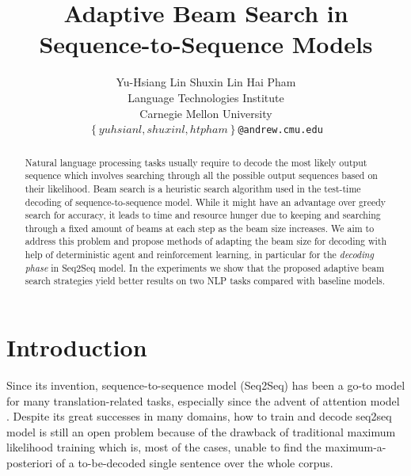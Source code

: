 \documentclass[11pt,a4paper]{article}
\title{Adaptive Beam Search in Sequence-to-Sequence Models}
\author{Yu-Hsiang Lin \quad Shuxin Lin \quad Hai Pham \\
  Language Technologies Institute \\
  Carnegie Mellon University \\
{\tt\small $\left\{yuhsianl, shuxinl, htpham\right\}$@andrew.cmu.edu}
  }
\date{}
\begin{document}
\maketitle
\begin{abstract}
Natural language processing tasks usually require to decode the most likely output sequence which involves searching through all the possible output sequences based on their likelihood. Beam search is a heuristic search algorithm used in the test-time decoding of sequence-to-sequence model. While it might have an advantage over greedy search for accuracy, it leads to time and resource hunger due to keeping and searching through a fixed amount of beams at each step as the beam size increases. We aim to address this problem and propose methods of adapting the beam size for decoding with help of deterministic agent and reinforcement learning, in particular for the \textit{decoding phase} in Seq2Seq model. In the experiments we show that the proposed adaptive beam search strategies yield better results on two NLP tasks compared with baseline models.
\end{abstract}

\section{Introduction} \label{sec:introduction}
Since its invention, sequence-to-sequence model (Seq2Seq) \cite{seq2seq_2014} has been a go-to model for many translation-related tasks,  %
especially since the advent of attention model \cite{bahdanau2014neural,luong2015effective}. Despite its great successes in many domains, how to train and decode seq2seq model is still an open problem because of the drawback of traditional maximum likelihood training which is, most of the cases, unable to find the maximum-a-posteriori of a to-be-decoded single sentence over the whole corpus. 
\end{document}

